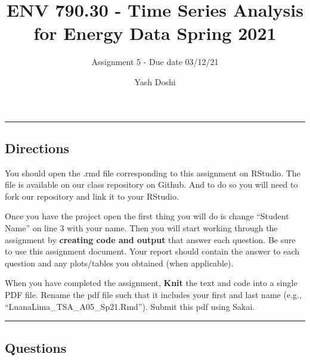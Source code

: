 \documentclass[
]{article}
\title{ENV 790.30 - Time Series Analysis for Energy Data \textbar{}
Spring 2021}
\subtitle{Assignment 5 - Due date 03/12/21}
\author{Yash Doshi}
\date{}
\newenvironment{Shaded}{\begin{snugshade}}{\end{snugshade}}
\newcommand{\AttributeTok}[1]{\textcolor[rgb]{0.77,0.63,0.00}{#1}}
\newcommand{\ConstantTok}[1]{\textcolor[rgb]{0.00,0.00,0.00}{#1}}
\newcommand{\DecValTok}[1]{\textcolor[rgb]{0.00,0.00,0.81}{#1}}
\newcommand{\FloatTok}[1]{\textcolor[rgb]{0.00,0.00,0.81}{#1}}
\newcommand{\FunctionTok}[1]{\textcolor[rgb]{0.00,0.00,0.00}{#1}}
\newcommand{\NormalTok}[1]{#1}
\newcommand{\SpecialCharTok}[1]{\textcolor[rgb]{0.00,0.00,0.00}{#1}}
\begin{document}
\maketitle

\begin{center}\rule{0.5\linewidth}{0.5pt}\end{center}

\hypertarget{directions}{%
\subsection{Directions}\label{directions}}

You should open the .rmd file corresponding to this assignment on
RStudio. The file is available on our class repository on Github. And to
do so you will need to fork our repository and link it to your RStudio.

Once you have the project open the first thing you will do is change
``Student Name'' on line 3 with your name. Then you will start working
through the assignment by \textbf{creating code and output} that answer
each question. Be sure to use this assignment document. Your report
should contain the answer to each question and any plots/tables you
obtained (when applicable).

When you have completed the assignment, \textbf{Knit} the text and code
into a single PDF file. Rename the pdf file such that it includes your
first and last name (e.g., ``LuanaLima\_TSA\_A05\_Sp21.Rmd''). Submit
this pdf using Sakai.

\begin{Shaded}
\end{Shaded}

\begin{center}\rule{0.5\linewidth}{0.5pt}\end{center}

\hypertarget{questions}{%
\subsection{Questions}\label{questions}}
\end{document}
